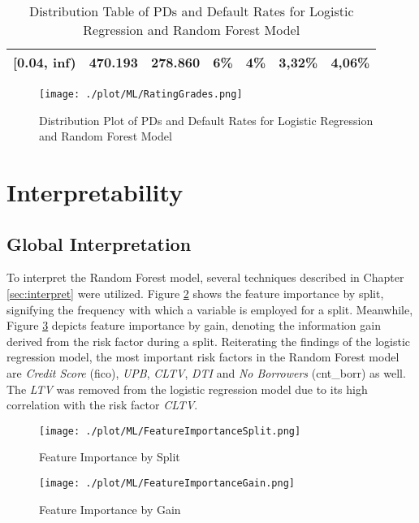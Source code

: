 \begin{table}[H]
\begin{tabular}{lrrrrrr}
{[}0.04, inf)    & 470.193                                & 278.860                               & 6\%                                    & 4\%                                   & 3,32\%                                 & 4,06\%        \\\bottomrule                       
\end{tabular}
\caption{Distribution Table of PDs and Default Rates for Logistic Regression and Random Forest Model}
\label{tab:re_distrDR}
\end{table}


\begin{figure}[H]
	\centering
	\texttt{[image: ./plot/ML/RatingGrades.png]}
    \caption{Distribution Plot of PDs and Default Rates for Logistic Regression and Random Forest Model}
    \label{fig:re_distrDR}
\end{figure}

\section{Interpretability}

\subsection{Global Interpretation}
To interpret the Random Forest model, several techniques described in Chapter \ref{sec:interpret} were utilized. Figure \ref{fig:re_featureimp_split} shows the feature importance by split, signifying the frequency with which a variable is employed for a split. Meanwhile, Figure \ref{fig:re_featureimp_gain} depicts feature importance by gain, denoting the information gain derived from the risk factor during a split. Reiterating the findings of the logistic regression model, the most important risk factors in the Random Forest model are \emph{Credit Score} (fico), \emph{UPB}, \emph{CLTV}, \emph{DTI} and \emph{No Borrowers} (cnt\_borr) as well. The \emph{LTV} was removed from the logistic regression model due to its high correlation with the risk factor \emph{CLTV}. 


\begin{figure}[H]
	\centering
	\texttt{[image: ./plot/ML/FeatureImportanceSplit.png]}
    \caption{Feature Importance by Split}
    \label{fig:re_featureimp_split}
\end{figure}

\begin{figure}[H]
	\centering
	\texttt{[image: ./plot/ML/FeatureImportanceGain.png]}
    \caption{Feature Importance by Gain}
    \label{fig:re_featureimp_gain}
\end{figure}

